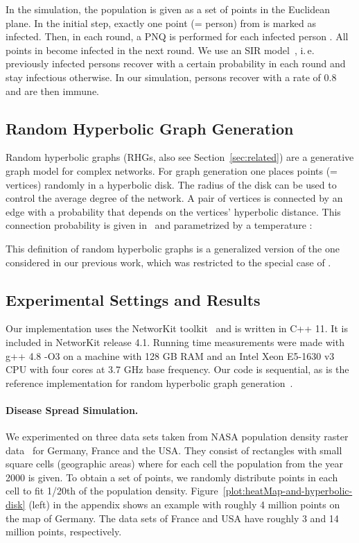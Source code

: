 \documentclass{llncs}
\newcommand{\ie}{i.\,e.\xspace}
\begin{document}
In the simulation, the population is given as a set  of points in the Euclidean plane.
 In the initial step, exactly one point (= person) from  is marked as infected. 
Then, in each round, a PNQ is performed
for each infected person .
All points in  become infected in the next round.
We use an SIR model~\cite{hethcote2000mathematics}, \ie previously infected persons recover with a 
certain probability in each round and stay infectious otherwise.
In our simulation, persons recover with a rate of 0.8 and are then immune.

\subsection{Random Hyperbolic Graph Generation}
\label{sec:application-hyperbolic-random-graphs}
Random hyperbolic graphs (RHGs, also see Section~\ref{sec:related}) are a generative graph model for
complex networks. For graph generation one places  points (= vertices) randomly in a hyperbolic disk.
The radius  of the disk can be used to control the average degree of the network.
A pair of vertices is connected by an edge with a probability that depends on the vertices' hyperbolic distance.
This connection probability is given in~\cite[Eq.~(41)]{Krioukov2010} and parametrized by a temperature :

This definition of random hyperbolic graphs is a generalized version of the one considered in our previous work, which was restricted to the special case of .

\subsection{Experimental Settings and Results}
\label{sub:exp-results}
Our implementation uses the NetworKit toolkit~\cite{staudt2014networkit} and is 
written in C++ 11. It is included in NetworKit release 4.1.
Running time measurements were made with g++ 4.8 -O3 on a machine with 128 GB RAM
and an Intel Xeon E5-1630 v3 CPU with four cores at 3.7 GHz base frequency. 
Our code is sequential, as is the reference implementation for random hyperbolic graph
generation~\cite{Aldecoa2015}.

\paragraph{Disease Spread Simulation.}
We experimented on three data sets
taken from NASA population density raster 
data~\cite{nasaGridPop} for Germany, France and the USA. They consist of rectangles with small square cells
(geographic areas) where for each cell the population from the year 2000 is given.
To obtain a set of points, we randomly distribute points in each cell to fit 1/20th of the population density.
Figure~\ref{plot:heatMap-and-hyperbolic-disk} (left) in the appendix shows an example with roughly 4 million points on the map of Germany.
The data sets of France and USA have roughly 3 and 14 million points, respectively.
\end{document}
